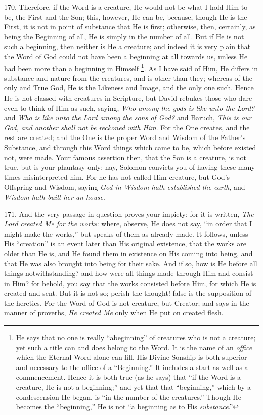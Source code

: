 170. Therefore, if the Word is
a creature, He would not be what I hold Him to be, the First and the
Son; this, however, He can be, because, though He is the First, it is
not in point of substance that He is first; otherwise, then,
certainly, as being the Beginning of all, He is simply in the number
of all. But if He is not such a beginning, then neither is He a
creature; and indeed it is very plain that the Word of God could not
have been a beginning at all towards us, unless He had been more than
a beginning in Himself \footnote{He says that no one is really ``a\emph{}beginning'' of creatures who is
not a creature; yet such a title can and does belong to the Word. It
is the name of an \emph{office} which the Eternal Word alone can fill,
His Divine Sonship is both superior and necessary to the office of a ``Beginning.''
It includes a start as well as a commencement. Hence it is both true
(as he says) that ``if the Word is a creature, He is not a beginning;''
and yet that that ``beginning,'' which by a condescension He began, is ``in
the number of the creatures.'' Though He becomes the ``beginning,'' He is
not ``a beginning as to His \emph{substance}.''}.
As I have said of Him, He differs in substance and nature from
the creatures, and is other than they; whereas of the only and True
God, He is the Likeness and Image, and the only one such. Hence He is
not classed with creatures in Scripture, but David rebukes those who
dare even to think of Him as such, saying, \emph{Who among the gods is
like unto the Lord?} and \emph{Who is like unto the Lord among the
sons of God?} and Baruch, \emph{This is our God, and another shall not
be reckoned with Him}. For the One creates, and the rest are
created; and the One is the proper Word and Wisdom of the Father's
Substance, and through this Word things which came to be, which before
existed not, were made. Your famous assertion then, that the Son is a
creature, is not true, but is your phantasy only; nay, Solomon
convicts you of having these many times misinterpreted him. For he has
not called Him creature, but God's Offspring and Wisdom, saying \emph{God
in Wisdom hath established the earth}, and \emph{Wisdom hath built her
an house}.

171. And the very passage in
question proves your impiety: for it is written, \emph{The Lord created
Me for the works}: where, observe, He does not say, ``in order that
I might make the works,'' but speaks of them as already made. It
follows, unless His ``creation'' is an event later than His original
existence, that the works are older than He is, and He found them in
existence on His coming into being, and that He was also brought into
being for their sake. And if so, how is He before all things
notwithstanding? and how were all things made through Him and consist
in Him? for behold, you say that the works consisted before Him, for
which He is created and sent. But it is not so; perish the thought!
false is the supposition of the heretics. For the Word of God is not
creature, but Creator; and says in the manner of proverbs, \emph{He
created Me} only when He put on created flesh.

